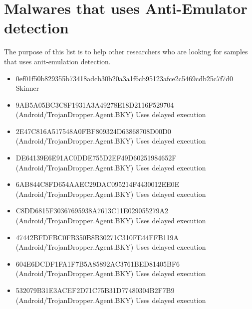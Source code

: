 \documentclass[../main.tex]{subfile}
\begin{document}
		\chapter{Malwares that uses Anti-Emulator detection}
	The purpose of this list is to help other researchers who are looking for samples that uses anit-emulation detection.
	\begin{itemize}
		\item 0ef01f50b829355b73418adcb30b20a3a1f6cb95123afce2c5469cdb25c7f7d0 Skinner
		\item 9AB5A05BC3C8F1931A3A49278E18D2116F529704 (Android/TrojanDropper.Agent.BKY) Uses delayed execution \cite{eset_multi_stage_malware}
		\item 2E47C816A517548A0FBF809324D63868708D00D0 (Android/TrojanDropper.Agent.BKY) Uses delayed execution \cite{eset_multi_stage_malware}
		\item DE64139E6E91AC0DDE755D2EF49D60251984652F (Android/TrojanDropper.Agent.BKY) Uses delayed execution \cite{eset_multi_stage_malware}
		\item 6AB844C8FD654AAEC29DAC095214F4430012EE0E (Android/TrojanDropper.Agent.BKY) Uses delayed execution \cite{eset_multi_stage_malware}
		\item C8DD6815F30367695938A7613C11E029055279A2 (Android/TrojanDropper.Agent.BKY) Uses delayed execution \cite{eset_multi_stage_malware}
		\item 47442BFDFBC0FB350B8B30271C310FE44FFB119A (Android/TrojanDropper.Agent.BKY) Uses delayed execution \cite{eset_multi_stage_malware}
		\item 604E6DCDF1FA1F7B5A85892AC3761BED81405BF6 (Android/TrojanDropper.Agent.BKY) Uses delayed execution \cite{eset_multi_stage_malware}
		\item 532079B31E3ACEF2D71C75B31D77480304B2F7B9 (Android/TrojanDropper.Agent.BKY) Uses delayed execution \cite{eset_multi_stage_malware}
	\end{itemize}
\end{document}
